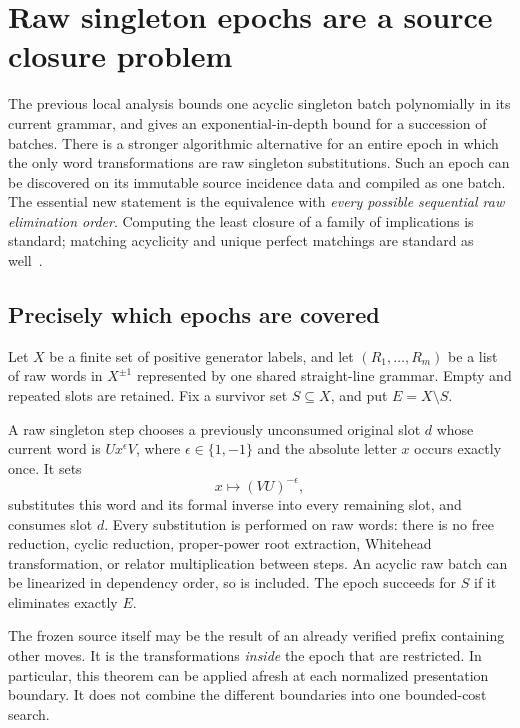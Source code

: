 \section{Raw singleton epochs are a source closure problem}
\label{sec:raw-epoch-theorem}

The previous local analysis bounds one acyclic singleton batch polynomially
in its current grammar, and gives an exponential-in-depth bound for a succession
of batches. There is a stronger algorithmic alternative for an entire epoch
in which the only word transformations are raw singleton substitutions.
Such an epoch can be discovered on its immutable source incidence data and
compiled as one batch. The essential new statement is the equivalence with
\emph{every possible sequential raw elimination order}. Computing the least
closure of a family of implications is standard; matching acyclicity and
unique perfect matchings are standard as well~\cite{kozen,golumbic,dowling}.

\subsection{Precisely which epochs are covered}

Let $X$ be a finite set of positive generator labels, and let
$(R_1,\ldots,R_m)$ be a list of raw words in $X^{\pm1}$ represented by one
shared straight-line grammar. Empty and repeated slots are retained. Fix a
survivor set $S\subseteq X$, and put $E=X\setminus S$.

A raw singleton step chooses a previously unconsumed original slot $d$
whose current word is $U x^\epsilon V$, where $\epsilon\in\{1,-1\}$ and
the absolute letter $x$ occurs exactly once. It sets
\[
 x\longmapsto (VU)^{-\epsilon},
\]
substitutes this word and its formal inverse into every remaining slot,
and consumes slot $d$. Every substitution is performed on raw words:
there is no free reduction, cyclic reduction, proper-power root extraction,
Whitehead transformation, or relator multiplication between steps.
An acyclic raw batch can be linearized in dependency order, so is included.
The epoch succeeds for $S$ if it eliminates exactly $E$.

The frozen source itself may be the result of an already verified prefix
containing other moves. It is the transformations \emph{inside} the epoch
that are restricted. In particular, this theorem can be applied afresh at
each normalized presentation boundary. It does not combine the different
boundaries into one bounded-cost search.

